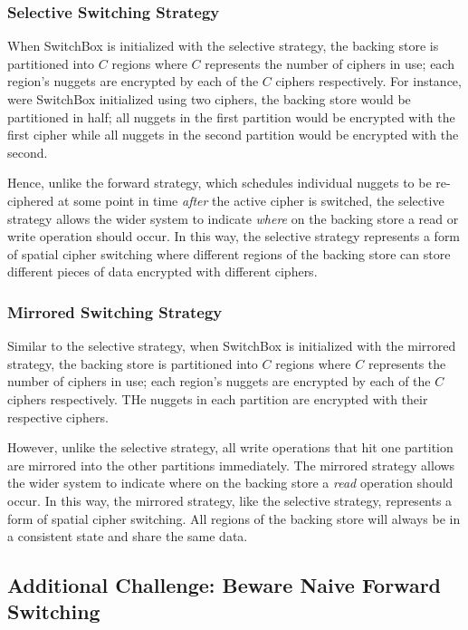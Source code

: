 \subsubsection{Selective Switching Strategy}

When SwitchBox is initialized with the selective strategy, the backing store is
partitioned into $C$ regions where $C$ represents the number of ciphers in use;
each region's nuggets are encrypted by each of the $C$ ciphers respectively. For
instance, were SwitchBox initialized using two ciphers, the backing store would
be partitioned in half; all nuggets in the first partition would be encrypted
with the first cipher while all nuggets in the second partition would be
encrypted with the second.

Hence, unlike the forward strategy, which schedules individual nuggets to be
re-ciphered at some point in time \emph{after} the active cipher is switched,
the selective strategy allows the wider system to indicate \emph{where} on the
backing store a read or write operation should occur. In this way, the selective
strategy represents a form of spatial cipher switching where different regions
of the backing store can store different pieces of data encrypted with different
ciphers.

\subsubsection{Mirrored Switching Strategy}

Similar to the selective strategy, when SwitchBox is initialized with the
mirrored strategy, the backing store is partitioned into $C$ regions where $C$
represents the number of ciphers in use; each region's nuggets are encrypted by
each of the $C$ ciphers respectively. THe nuggets in each partition are
encrypted with their respective ciphers.

However, unlike the selective strategy, all write operations that hit one
partition are mirrored into the other partitions immediately. The mirrored
strategy allows the wider system to indicate where on the backing store a
\emph{read} operation should occur. In this way, the mirrored strategy, like the
selective strategy, represents a form of spatial cipher switching. All regions
of the backing store will always be in a consistent state and share the same
data.

\subsection{Additional Challenge: Beware Naive Forward Switching}

